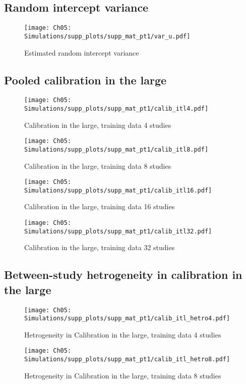 
\subsection{Random intercept variance}
\begin{figure}[H]
  \centering
  \texttt{[image: Ch05: Simulations/supp\_plots/supp\_mat\_pt1/var\_u.pdf]}
  \caption{Estimated random intercept variance}
\end{figure}

\subsection{Pooled calibration in the large}
\begin{figure}[H]
  \centering
  \texttt{[image: Ch05: Simulations/supp\_plots/supp\_mat\_pt1/calib\_itl4.pdf]}
  \caption{Calibration in the large, training data 4 studies}
\end{figure}

\begin{figure}[H]
  \centering
  \texttt{[image: Ch05: Simulations/supp\_plots/supp\_mat\_pt1/calib\_itl8.pdf]}
  \caption{Calibration in the large, training data 8 studies}
\end{figure}

\begin{figure}[H]
  \centering
  \texttt{[image: Ch05: Simulations/supp\_plots/supp\_mat\_pt1/calib\_itl16.pdf]}
  \caption{Calibration in the large, training data 16 studies}
\end{figure}

\begin{figure}[H]
  \centering
  \texttt{[image: Ch05: Simulations/supp\_plots/supp\_mat\_pt1/calib\_itl32.pdf]}
  \caption{Calibration in the large, training data 32 studies}
\end{figure}

\subsection{Between-study hetrogeneity in calibration in the large}
\begin{figure}[H]
  \centering
  \texttt{[image: Ch05: Simulations/supp\_plots/supp\_mat\_pt1/calib\_itl\_hetro4.pdf]}
  \caption{Hetrogeneity in Calibration in the large, training data 4 studies}
\end{figure}

\begin{figure}[H]
  \centering
  \texttt{[image: Ch05: Simulations/supp\_plots/supp\_mat\_pt1/calib\_itl\_hetro8.pdf]}
  \caption{Hetrogeneity in Calibration in the large, training data 8 studies}
\end{figure}

